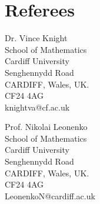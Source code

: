 \documentclass[a4paper]{article}
\begin{document}
\section{Referees}

\begin{minipage}[b]{0.5\linewidth}
Dr. Vince Knight\\
School of Mathematics\\
Cardiff University\\
Senghennydd Road\\
CARDIFF, Wales, UK.\\
CF24 4AG\\
knightva@cf.ac.uk
\end{minipage}
%
%
\begin{minipage}[b]{0.5\linewidth}
Prof. Nikolai Leonenko\\
School of Mathematics\\
Cardiff University\\
Senghennydd Road\\
CARDIFF, Wales, UK.\\
CF24 4AG\\
LeonenkoN@cardiff.ac.uk
\end{minipage}






\end{document}
